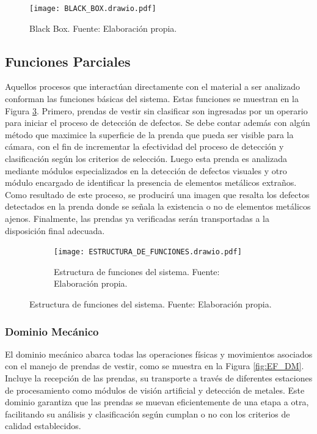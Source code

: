 \begin{figure}[H]
	\centering
	\texttt{[image: BLACK\_BOX.drawio.pdf]}
	\caption[Black Box.]{Black Box. Fuente: Elaboración propia.}
	\label{fig:BLACK_BOX}
\end{figure}

\subsection{Funciones Parciales}
\label{Funciones Parciales}

Aquellos procesos que interactúan directamente con el material a ser analizado conforman las funciones básicas del sistema. Estas funciones se muestran en la Figura \ref{fig:ESTRUCTURA_DE_FUNCIONES}. Primero, prendas de vestir sin clasificar son ingresadas por un operario para iniciar el proceso de detección de defectos. Se debe contar además con algún método que maximice la superficie de la prenda que pueda ser visible para la cámara, con el fin de incrementar la efectividad del proceso de detección y clasificación según los criterios de selección. Luego esta prenda es analizada mediante módulos especializados en la detección de defectos visuales y otro módulo encargado de identificar la presencia de elementos metálicos extraños. Como resultado de este proceso, se producirá una imagen que resalta los defectos detectados en la prenda donde se señala la existencia o no de elementos metálicos ajenos. Finalmente, las prendas ya verificadas serán transportadas a la disposición final adecuada.

\begin{figure}
	\begin{figure}[H]
		\centering
		\texttt{[image: ESTRUCTURA\_DE\_FUNCIONES.drawio.pdf]}
		\caption[Estructura de funciones del sistema.]{Estructura de funciones del sistema. Fuente: Elaboración propia.}
		\label{fig:ESTRUCTURA_DE_FUNCIONES}
	\end{figure}
\end{figure}

\subsubsection{Dominio Mecánico}

El dominio mecánico abarca todas las operaciones físicas y movimientos asociados con el manejo de prendas de vestir, como se muestra en la Figura \ref{fig:EF_DM}. Incluye la recepción de las prendas, su transporte a través de diferentes estaciones de procesamiento como módulos de visión artificial y detección de metales. Este dominio garantiza que las prendas se muevan eficientemente de una etapa a otra, facilitando su análisis y clasificación según cumplan o no con los criterios de calidad establecidos.

